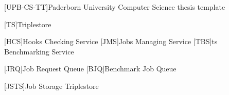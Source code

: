 \theoremstyle{plain}
\newtheorem{definition}{Definition}[chapter]
\newtheorem{lemma}[definition]{Lemma}
\ifgerman
	\newtheorem{theorem}[definition]{Satz}
	\newtheorem{corollary}[definition]{Korollar}
	\newtheorem{example}[definition]{Beispiel}
\else
	\newtheorem{theorem}[definition]{Theorem}
	\newtheorem{corollary}[definition]{Corollary}
	\newtheorem{example}[definition]{Example}
\fi



\newcommand*{\eg}{e.\,g.}
\newcommand*{\ie}{i.\,e.}
\newcommand*{\cf}{c.\,f.}
\newcommand*{\etal}{et~al.}

[UPB-CS-TT]{Paderborn University Computer Science thesis template}

\DeclareMathOperator{\testop}{top}

[TS]{Triplestore}

\newcommand*{\ts}{\acl*{ts}}
\newcommand*{\tsp}{\aclp*{ts}}

\newcommand*{\iguana}{\textsc{Iguana}}
\newcommand*{\tentris}{\textsc{Tentris}}


\newcommand*{\gh}{GitHub}
\newcommand*{\dockh}{Docker Hub}

[HCS]{Hooks Checking Service}
[JMS]{Jobs Managing Service}
[TBS]{\ts{} Benchmarking Service}

[JRQ]{Job Request Queue}
[BJQ]{Benchmark Job Queue}

[JSTS]{Job Storage Triplestore}


\lstset{
	basicstyle=\scriptsize\ttfamily,
	numbers=left
}